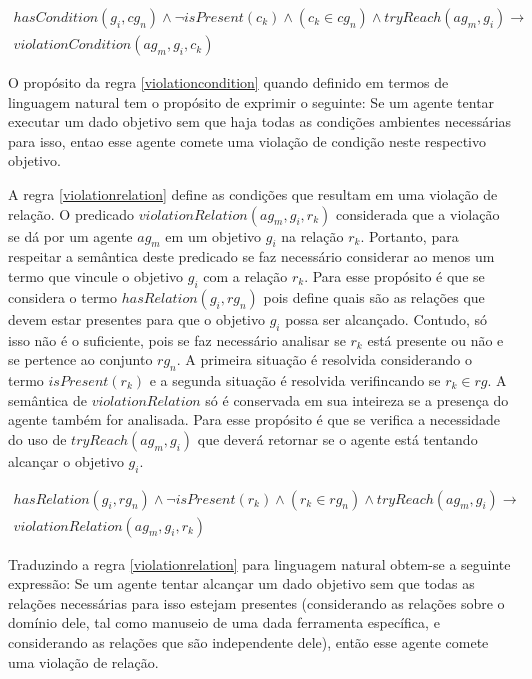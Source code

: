 \begin{eqnarray}\label{violationcondition}\nonumber
	hasCondition(g_i,cg_n) \wedge \neg isPresent(c_k) \wedge (c_k \in cg_n) \wedge tryReach(ag_m,g_i) \to \nonumber \\  
	violationCondition(ag_m,g_i,c_k) 
\end{eqnarray}

O propósito da regra \ref{violationcondition} quando definido em termos de linguagem natural tem o propósito de exprimir o seguinte: Se um agente tentar 
executar um dado objetivo sem que haja todas as condições ambientes necessárias para isso, entao esse agente comete uma violação de condição neste 
respectivo objetivo. 

A regra \ref{violationrelation} define as condições que resultam em uma violação de relação. O predicado $violationRelation(ag_m,g_i,r_k)$ considerada 
que a violação se dá por um agente $ag_m$ em um objetivo $g_i$ na relação $r_k$. Portanto, para respeitar a semântica deste predicado se faz necessário 
considerar ao menos um termo que vincule o objetivo $g_i$ com a relação $r_k$. Para esse propósito é que se considera o termo $hasRelation(g_i,rg_n)$ 
pois define quais são as relações que devem estar presentes para que o objetivo $g_i$ possa ser alcançado. Contudo, só isso não é o suficiente, pois 
se faz necessário analisar se $r_k$ está presente ou não e se pertence ao conjunto $rg_n$. A primeira situação é resolvida considerando o termo $isPresent(r_k)$
e a segunda situação é resolvida verifincando se $r_k \in rg$. A semântica de $violationRelation$ só é conservada em sua inteireza se a presença do 
agente também for analisada. Para esse propósito é que se verifica a necessidade do uso de $tryReach(ag_m,g_i)$ que deverá retornar se o agente 
está tentando alcançar o objetivo $g_i$.   

\begin{eqnarray}\label{violationrelation}\nonumber
	hasRelation(g_i,rg_n)\wedge \neg isPresent(r_k) \wedge (r_k \in rg_n) \wedge tryReach(ag_m,g_i) \to \nonumber \\
	violationRelation(ag_m,g_i,r_k)
\end{eqnarray}

Traduzindo a regra \ref{violationrelation} para linguagem natural obtem-se a seguinte expressão: Se um agente tentar alcançar um dado objetivo sem que todas 
as relações necessárias para isso estejam presentes (considerando as relações sobre o domínio dele, tal como manuseio de uma dada ferramenta específica, e 
considerando as relações que são independente dele), então esse agente comete uma violação de relação. 

